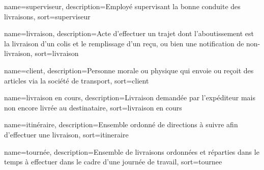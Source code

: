 {
	name={superviseur},
	description={Employé supervisant la bonne conduite des livraisons},
	sort={superviseur}
}

{
	name={livraison},
	description={Acte d'effectuer un trajet dont l'aboutissement est la livraison d'un colis et le remplissage d'un reçu, ou bien une notification de non-livraison},
	sort={livraison}
}

{
	name={client},
	description={Personne morale ou physique qui envoie ou reçoit des articles via la société de transport},
	sort={client}
}

{
	name={livraison en cours},
	description={Livraison demandée par l'expéditeur mais non encore livrée au destinataire},
	sort={livraison en cours}
}

{
	name={itinéraire},
	description={Ensemble ordonné de directions à suivre afin d'effectuer une livraison},
	sort={itineraire}
}

{
	name={tournée},
	description={Ensemble de livraisons ordonnées et réparties dans le temps à effectuer dans le cadre d'une journée de travail},
	sort={tournee}
}

